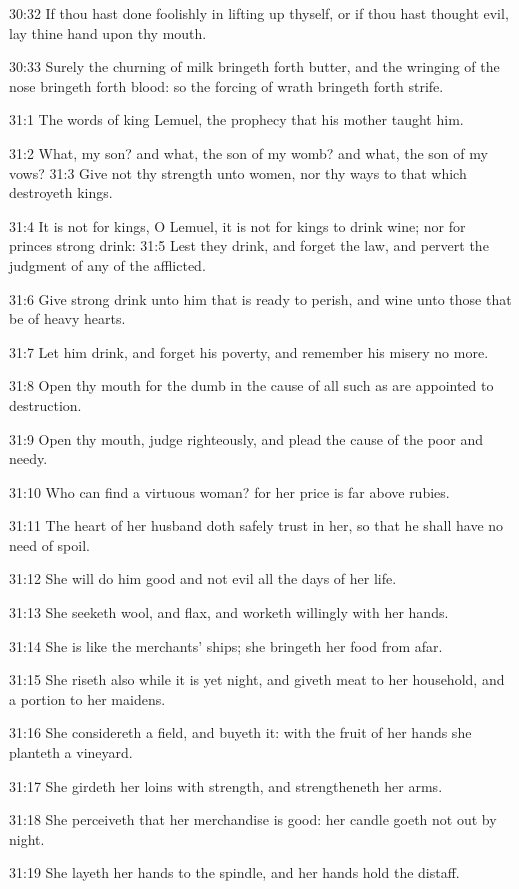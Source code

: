 30:32 If thou hast done foolishly in lifting up thyself, or if thou hast thought evil, lay thine hand upon thy mouth.

30:33 Surely the churning of milk bringeth forth butter, and the wringing of the nose bringeth forth blood: so the forcing of wrath bringeth forth strife.

31:1 The words of king Lemuel, the prophecy that his mother taught him.

31:2 What, my son? and what, the son of my womb? and what, the son of my vows?  31:3 Give not thy strength unto women, nor thy ways to that which destroyeth kings.

31:4 It is not for kings, O Lemuel, it is not for kings to drink wine; nor for princes strong drink: 31:5 Lest they drink, and forget the law, and pervert the judgment of any of the afflicted.

31:6 Give strong drink unto him that is ready to perish, and wine unto those that be of heavy hearts.

31:7 Let him drink, and forget his poverty, and remember his misery no more.

31:8 Open thy mouth for the dumb in the cause of all such as are appointed to destruction.

31:9 Open thy mouth, judge righteously, and plead the cause of the poor and needy.

31:10 Who can find a virtuous woman? for her price is far above rubies.

31:11 The heart of her husband doth safely trust in her, so that he shall have no need of spoil.

31:12 She will do him good and not evil all the days of her life.

31:13 She seeketh wool, and flax, and worketh willingly with her hands.

31:14 She is like the merchants' ships; she bringeth her food from afar.

31:15 She riseth also while it is yet night, and giveth meat to her household, and a portion to her maidens.

31:16 She considereth a field, and buyeth it: with the fruit of her hands she planteth a vineyard.

31:17 She girdeth her loins with strength, and strengtheneth her arms.

31:18 She perceiveth that her merchandise is good: her candle goeth not out by night.

31:19 She layeth her hands to the spindle, and her hands hold the distaff.

